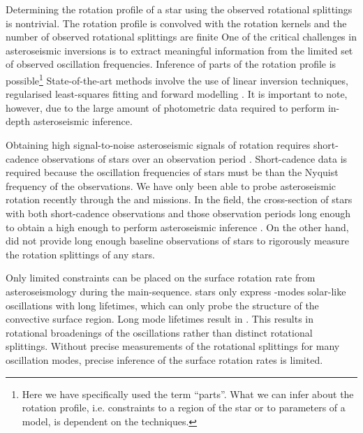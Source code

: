 Determining the rotation profile of a star using the observed rotational splittings is nontrivial. The rotation profile is convolved with the rotation kernels and the number of observed rotational splittings are finite One of the critical challenges in asteroseismic inversions is to extract meaningful information from the limited set of observed oscillation frequencies. Inference of parts of the rotation profile is possible\footnote{Here we have specifically used the term “parts”. What we can infer about the rotation profile, i.e. constraints to a region of the star or to parameters of a model, is dependent on the techniques.}
State-of-the-art methods involve the use of linear inversion techniques, regularised least-squares fitting and forward modelling \citep[see, e.g.][ for thorough discussion of these techniques]{christensen-dalsgaard_comparison_1990, christensen-dalsgaard_generalized_1993,aerts_asteroseismology_2010}.
It is important to note, however, due to the large amount of photometric data required to perform in-depth asteroseismic inference.

Obtaining high signal-to-noise asteroseismic signals of rotation requires short-cadence observations of stars over an observation period  \citep{deheuvels_seismic_2014}.
Short-cadence data is required because the oscillation frequencies of stars must be  than the Nyquist frequency of the observations.
We have only been able to probe asteroseismic rotation recently through the \kepler{} and \ktoo{} missions.
In the \kepler{} field, the cross-section of stars with both short-cadence observations and those observation periods long enough to obtain a high enough  to perform asteroseismic inference .
On the other hand, \ktoo{} did not provide long enough baseline observations of stars to rigorously measure the rotation splittings of any stars.

Only limited constraints can be placed on the surface rotation rate from asteroseismology during the main-sequence.
stars only express -modes solar-like oscillations with long lifetimes, which can only probe the structure of the convective surface region.
Long mode lifetimes result in .
This results in rotational broadenings of the oscillations rather than distinct rotational splittings.
Without precise measurements of the rotational splittings for many oscillation modes, precise inference of the surface rotation rates is limited.

